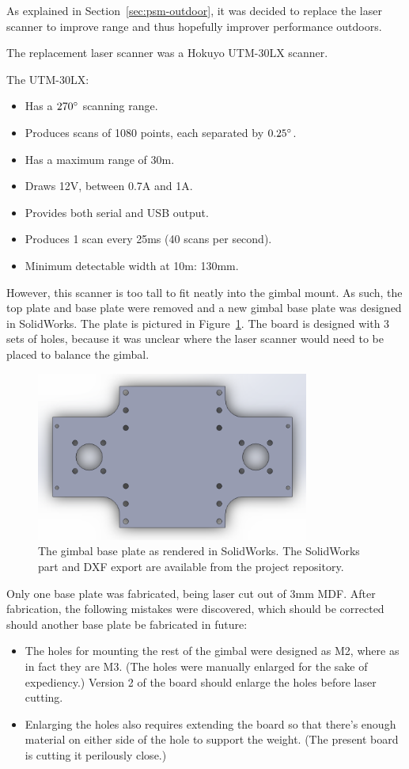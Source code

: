\documentclass[12pt,oneside,a4paper]{book}
\begin{document}
As explained in Section~\ref{sec:psm-outdoor}, it was decided to
replace the laser scanner to improve range and thus hopefully improver
performance outdoors.

The replacement laser scanner was a Hokuyo UTM-30LX scanner. 

The UTM-30LX:
\begin{itemize}
\item Has a $270\degree$ scanning range.
\item Produces scans of 1080 points, each separated by $0.25\degree$.
\item Has a maximum range of 30m.
\item Draws 12V, between 0.7A and 1A.
\item Provides both serial and USB output.
\item Produces 1 scan every 25ms (40 scans per second).
\item Minimum detectable width at 10m: 130mm.
\end{itemize}

However, this scanner is too tall to fit neatly into the gimbal
mount. As such, the top plate and base plate were removed and a new
gimbal base plate was designed in SolidWorks. The plate is pictured in
Figure~\ref{fig:baseplate}. The board is designed with 3 sets of
holes, because it was unclear where the laser scanner would need to be
placed to balance the gimbal.

\begin{figure}[h]
  \centering
  \includegraphics[width=0.8\textwidth]{figs/baseplate}
  \caption{The gimbal base plate as rendered in SolidWorks. The SolidWorks part and DXF export are available from the project repository.}
  \label{fig:baseplate}
\end{figure}

Only one base plate was fabricated, being laser cut out of 3mm
MDF. After fabrication, the following mistakes were discovered, which
should be corrected should another base plate be fabricated in future:
\begin{itemize}
\item The holes for mounting the rest of the gimbal were designed as
  M2, where as in fact they are M3. (The holes were manually enlarged
  for the sake of expediency.) Version 2 of the board should enlarge
  the holes before laser cutting.
\item Enlarging the holes also requires extending the board so that
  there's enough material on either side of the hole to support the
  weight. (The present board is cutting it perilously close.)
\end{itemize}
\end{document}
